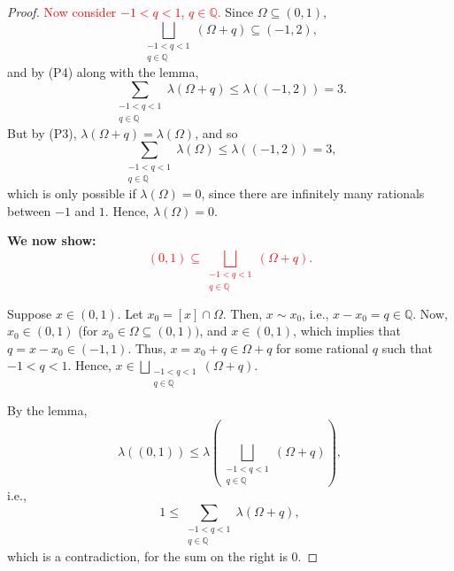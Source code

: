 \documentclass[12pt]{extarticle}
\newcommand{\Q}{\mathbb{Q}}
\newcommand{\sub}{\subseteq}
\begin{document}
\begin{proof}
\textcolor{red}{Now consider $-1 < q < 1$, $q \in \Q$.} Since $\Omega \sub (0, 1)$, 
\[ \bigsqcup_{\substack{-1 < q < 1 \\ q \in \Q}}(\Omega + q) \sub (-1, 2), \]
and by (P4) along with the lemma, 
\[ \sum_{\substack{-1 < q < 1 \\ q \in \Q} } \lambda(\Omega + q) \leq \lambda((-1, 2)) = 3 .\]
But by (P3), $\lambda(\Omega + q) = \lambda(\Omega)$, and so
\[ \sum_{\substack{-1 < q < 1 \\ q \in \Q} } \lambda(\Omega) \leq \lambda((-1, 2)) = 3, \]
which is only possible if $\lambda(\Omega) = 0$, since there are infinitely many rationals between $-1$ and $1$. Hence, $\lambda(\Omega) = 0$.

\textbf{We now show: }
\textcolor{red}{
\[ (0, 1) \sub \bigsqcup_{\substack{-1 < q < 1 \\ q \in \Q}}(\Omega + q). \]}

Suppose $x \in (0, 1)$. Let $x_0 = [x] \cap \Omega$. Then, $x  \sim x_0$, i.e., $x - x_0 = q \in \Q$. Now, $x_0 \in (0, 1)$ (for $x_0 \in \Omega \sub (0, 1))$, and $x \in (0, 1)$, which implies that $q = x - x_0 \in (-1, 1)$. Thus, $x = x_0 + q \in \Omega + q$ for some rational $q$ such that $-1 < q < 1$. Hence, $x \in \bigsqcup_{\substack{-1 < q < 1 \\ q \in \Q}}(\Omega + q)$.

By the lemma, 
\[ \lambda((0, 1)) \leq \lambda \left( \bigsqcup_{\substack{-1 < q < 1 \\ q \in \Q}}(\Omega + q) \right), \]
i.e., 
\[ 1 \leq \sum_{\substack{-1 < q < 1 \\ q \in \Q}} \lambda(\Omega + q), \]
which is a contradiction, for the sum on the right is $0$. 
\end{proof}
\end{document}
